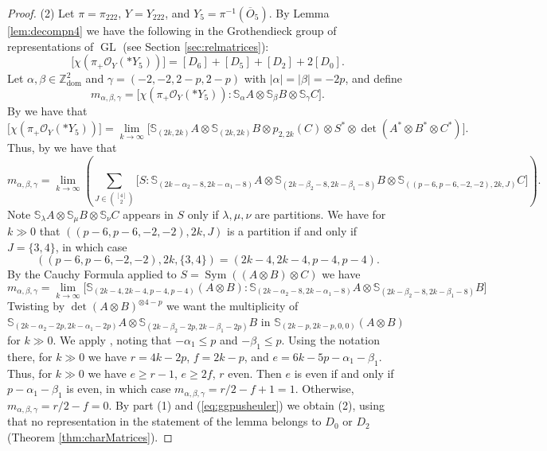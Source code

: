 \documentclass[11pt,reqno]{amsart}
\newcommand{\oo}{\otimes}
\newcommand{\bS}{\mathbb{S}}
\newcommand{\GL}{\operatorname{GL}}
\newcommand{\Sym}{\operatorname{Sym}}
\renewcommand{\det}{\operatorname{det}}
\newcommand{\dom}{\operatorname{dom}}
\newcommand{\mc}[1]{\mathcal{#1}}
\newcommand{\ol}[1]{\overline{#1}}
\numberwithin{equation}{section}
\begin{document}
\begin{proof}
(2) Let $\pi=\pi_{222}$, $Y=Y_{222}$, and $Y_5=\pi^{-1}(\ol{O}_5)$. By Lemma \ref{lem:decompn4} we have the following in the Grothendieck group of representations of $\GL$ (see Section \ref{sec:relmatrices}):
\begin{equation}\label{eq:ggpusheuler}
\big[\chi(\pi_{+}\mc{O}_Y(\ast Y_5))\big]=[D_6]+[D_5]+[D_2]+2[D_0].
\end{equation}
Let $\alpha,\beta\in \mathbb{Z}^2_{\dom}$ and $\gamma=(-2,-2,2-p,2-p)$ with $|\alpha|=|\beta|=-2p$, and define
$$
m_{\alpha,\beta,\gamma}=\big[ \chi(\pi_+ \mc{O}_Y(\ast Y_5)):\bS_{\alpha}A\oo \bS_{\beta}B \oo \bS_{\gamma}C\big].
$$
By \cite[Lemma 2.5, Proposition 2.10]{raicu2016characters} we have that 
$$
\big[\chi(\pi_+ \mc{O}_Y(\ast Y_5))\big]=\lim_{k\to \infty} \big[\bS_{(2k,2k)}A\oo \bS_{(2k,2k)}B\oo p_{2,2k}(C)\oo 
 S^{\ast}\otimes \det(A^{\ast}\oo B^{\ast}\oo C^{\ast})\big].
$$
Thus, by \cite[Lemma 2.3]{raicu2016characters} we have that
$$
m_{\alpha,\beta,\gamma}=\lim_{k\to \infty}\left(\sum_{J\in \binom{[4]}{2}}\big[S:\bS_{(2k-\alpha_2-8,2k-\alpha_1-8)}A\oo \bS_{(2k-\beta_2-8,2k-\beta_1-8)}B \oo \bS_{((p-6,p-6,-2,-2),2k,J)}C \big]\right).
$$
Note $\bS_{\lambda}A\oo \bS_{\mu}B\oo \bS_{\nu}C$ appears in $S$ only if $\lambda,\mu,\nu$ are partitions. We have for $k\gg 0$ that $((p-6,p-6,-2,-2),2k,J)$ is a partition if and only if $J=\{3,4\}$, in which case
$$
((p-6,p-6,-2,-2),2k,\{3,4\})=(2k-4,2k-4, p-4, p-4).
$$
By the Cauchy Formula applied to $S=\Sym((A\oo B)\oo C)$ we have
$$
m_{\alpha,\beta,\gamma}=\lim_{k\to \infty}\big[\bS_{(2k-4,2k-4, p-4, p-4)}(A\oo B):\bS_{(2k-\alpha_2-8,2k-\alpha_1-8)}A\oo \bS_{(2k-\beta_2-8,2k-\beta_1-8)}B]
$$
Twisting by $\det(A\oo B)^{\otimes 4-p}$ we want the multiplicity of $\bS_{(2k-\alpha_2-2p,2k-\alpha_1-2p)}A\oo \bS_{(2k-\beta_2-2p,2k-\beta_1-2p)}B$ in $\bS_{(2k-p,2k-p, 0, 0)}(A\oo B)$ for $k\gg 0$. We apply \cite[Corollary 4.3b]{raicu2012secant}, noting that $-\alpha_1\leq p$ and $-\beta_1\leq p$. Using the notation there, for $k\gg 0$ we have $r=4k-2p$, $f=2k-p$, and $e=6k-5p-\alpha_1-\beta_1$. Thus, for $k\gg 0$ we have $e\geq r-1$, $e\geq 2f$, $r$ even. Then $e$ is even if and only if $p-\alpha_1-\beta_1$ is even, in which case $m_{\alpha,\beta,\gamma}=r/2-f+1=1$. Otherwise, $m_{\alpha,\beta,\gamma}=r/2-f=0$. By part (1) and (\ref{eq:ggpusheuler}) we obtain (2), using that  no representation in the statement of the lemma belongs to $D_0$ or $D_2$ (Theorem \ref{thm:charMatrices}).
\end{proof}
\end{document}
